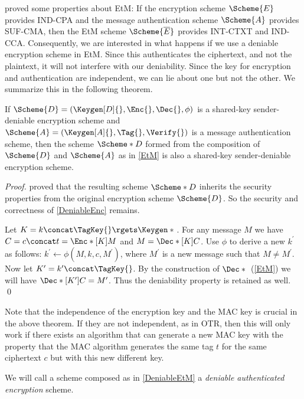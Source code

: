 \citet{AuthEncryption} proved some properties about \ac{EtM}:
If the encryption scheme \(\Scheme{E}\) provides \ac{IND-CPA} and the message 
authentication scheme \(\Scheme{A}\) provides \ac{SUF-CMA}, then the \ac{EtM} 
scheme \(\Scheme{\overline{E}}\) provides \ac{INT-CTXT} and \ac{IND-CCA}.
Consequently, we are interested in what happens if we use a deniable encryption 
scheme in \ac{EtM}.
Since this authenticates the ciphertext, and not the plaintext, it will not 
interfere with our deniability.
Since the key for encryption and authentication are independent, we can lie 
about one but not the other.
We summarize this in the following theorem.

\begin{theorem}\label{DeniableEtM}
  If \(\Scheme{D} = (\Keygen[D]{}, \Enc{}, \Dec{}, \phi)\) is a shared-key 
  sender-deniable encryption scheme and \(\Scheme{A} = (\Keygen[A]{}, \Tag{}, 
    \Verify{})\) is a message authentication scheme,
  then the scheme \(\Scheme*{D}\) formed from the composition of \(\Scheme{D}\) 
  and \(\Scheme{A}\) as in \cref{EtM} is also a shared-key sender-deniable 
  encryption scheme.
\end{theorem}
\begin{proof}
  \citet{AuthEncryption} proved that the resulting scheme \(\Scheme*{D}\) 
  inherits the security properties from the original encryption scheme 
  \(\Scheme{D}\).
  So the security and correctness of \cref{DeniableEnc} remains.

  Let \(K = k\concat \TagKey{} \rgets \Keygen*{}\).
  For any message \(M\) we have \(C = c\concat t = \Enc*[K]{ M }\) and \(M 
    = \Dec*[K]{ C }\).
  Use \(\phi\) to derive a new \(k^\prime\) as follows:
  \(k^\prime\gets \phi( M, k, c, M^\prime )\), where \(M^\prime\) is 
  a new message such that \(M\neq M^\prime\).
  Now let \(K^\prime = k^\prime\concat \TagKey{}\).
  By the construction of \(\Dec*{}\) (\cref{EtM}) we will have 
  \(\Dec*[K^\prime]{ C } = M^\prime\).
  Thus the deniability property is retained as well.
  \qed{}
\end{proof}

Note that the independence of the encryption key and the \ac{MAC} key is 
crucial in the above theorem.
If they are not independent, as in \ac{OTR}, then this will only work if there 
exists an algorithm that can generate a new \ac{MAC} key with the property that 
the \ac{MAC} algorithm generates the same tag \(t\) for the same ciphertext 
\(c\) but with this new different key.

We will call a scheme composed as in \cref{DeniableEtM} a \emph{deniable 
  authenticated encryption} scheme.


